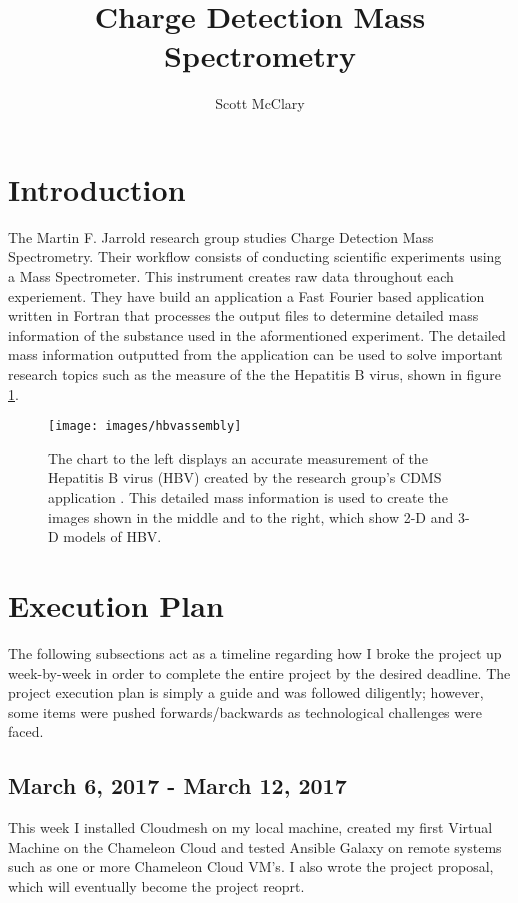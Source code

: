 \documentclass[9pt,twocolumn,twoside]{../../styles/osajnl}
\title{Charge Detection Mass Spectrometry}
\author[1,*]{Scott McClary}
\affil[1]{School of Informatics and Computing, Bloomington, IN 47408, U.S.A.}
\affil[*]{Corresponding authors: scmcclar@indiana.edu}
\begin{document}
\maketitle

\section{Introduction} \label{introduction}
The Martin F. Jarrold research group studies Charge Detection Mass
Spectrometry. Their workflow consists of conducting scientific
experiments using a Mass Spectrometer. This instrument creates raw
data throughout each experiement. They have build an application a
Fast Fourier based application written in Fortran that processes the
output files to determine detailed mass information of the substance
used in the aformentioned experiment. The detailed mass information
outputted from the application can be used to solve important research
topics such as the measure of the the Hepatitis B virus, shown in figure
\ref{fig:hbvassembly}.

\begin{figure}
\centering
\texttt{[image: images/hbvassembly]}
\caption{The chart to the left displays an accurate measurement of the Hepatitis B virus (HBV) created by the research group's CDMS application \cite{247}. This detailed mass information is used to create the images shown in the middle and to the right, which show 2-D and 3-D models of HBV.}
\label{fig:hbvassembly}
\end{figure}

\section{Execution Plan} \label{plan}
The following subsections act as a timeline regarding how I broke the
project up week-by-week in order to complete the entire project by the
desired deadline. The project execution plan is simply a guide and was
followed diligently; however, some items were pushed
forwards/backwards as technological challenges were faced.
\subsection{March 6, 2017 - March 12, 2017}
This week I installed Cloudmesh on my local machine, created my first
Virtual Machine on the Chameleon Cloud and tested Ansible Galaxy on
remote systems such as one or more Chameleon Cloud VM's. I also wrote
the project proposal, which will eventually become the project reoprt.
\end{document}
